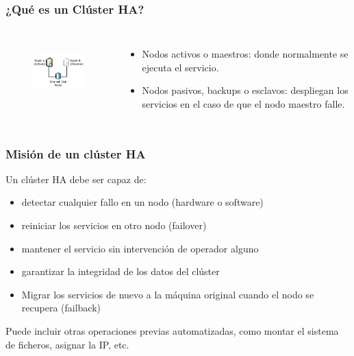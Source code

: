 \documentclass{beamer}
\begin{document}

\begin{frame}
\frametitle{¿Qué es un Clúster HA?}

\begin{columns}

\column[t]{4cm}

\begin{figure}[h]

\begin{center}
  \centering
  \includegraphics[height=1in]{figs/cluster.png}
\end{center}
\end{figure}


\column[t]{7.5cm}

\begin{itemize}
	\item \alert{Nodos activos} o \alert{maestros}: donde normalmente se ejecuta el servicio.
	\item \alert{Nodos pasivos}, \alert{backups} o \alert{esclavos}: despliegan los servicios en el caso de que el nodo maestro falle. 
\end{itemize}

\end{columns}


\end{frame}



\begin{frame}
\frametitle{Misión de un clúster HA}

Un clúster HA debe ser capaz de: 

\begin{itemize}
\item detectar cualquier fallo en un nodo (hardware o software)
\item reiniciar los servicios en otro nodo (\alert{failover})
\item mantener el servicio sin intervención de operador alguno
\item garantizar la integridad de los datos del clúster
\item Migrar los servicios de nuevo a la máquina original cuando el nodo se recupera (\alert{failback})
\end{itemize}

\bigskip

\small
Puede incluir otras operaciones previas automatizadas, como montar el sistema de ficheros, asignar la IP, etc. 

\end{frame}
\end{document}

